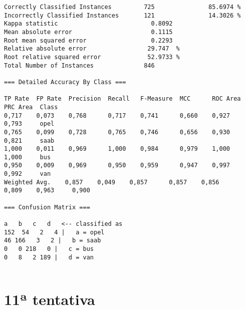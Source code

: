 \documentclass[
	article,			%
	11pt,				%
	oneside,			%
	a4paper,			%
	english,			%
	brazil,				%
	sumario=tradicional
	]{abntex2}
\begin{document}
\begin{lstlisting}
Correctly Classified Instances         725               85.6974 %
Incorrectly Classified Instances       121               14.3026 %
Kappa statistic                          0.8092
Mean absolute error                      0.1115
Root mean squared error                  0.2293
Relative absolute error                 29.747  %
Root relative squared error             52.9733 %
Total Number of Instances              846     

=== Detailed Accuracy By Class ===

TP Rate  FP Rate  Precision  Recall   F-Measure  MCC      ROC Area  PRC Area  Class
0,717    0,073    0,768      0,717    0,741      0,660    0,927     0,793     opel
0,765    0,099    0,728      0,765    0,746      0,656    0,930     0,821     saab
1,000    0,011    0,969      1,000    0,984      0,979    1,000     1,000     bus
0,950    0,009    0,969      0,950    0,959      0,947    0,997     0,992     van
Weighted Avg.    0,857    0,049    0,857      0,857    0,856      0,809    0,963     0,900     

=== Confusion Matrix ===

a   b   c   d   <-- classified as
152  54   2   4 |   a = opel
46 166   3   2 |   b = saab
0   0 218   0 |   c = bus
0   8   2 189 |   d = van


\end{lstlisting}

\newpage

\section{11ª tentativa}
\end{document}
